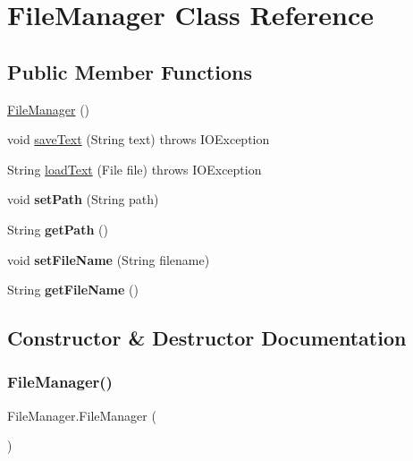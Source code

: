 \hypertarget{class_file_manager}{}\section{File\+Manager Class Reference}
\label{class_file_manager}
\subsection*{Public Member Functions}
\begin{DoxyCompactItemize}
\item 
\mbox{\hyperlink{class_file_manager_aa50d12a023aa967642bdd375208ab1f1}{File\+Manager}} ()
\item 
void \mbox{\hyperlink{class_file_manager_a8e3de78e77b7bf9e4a4581577ff75b23}{save\+Text}} (String text)  throws I\+O\+Exception 
\item 
String \mbox{\hyperlink{class_file_manager_a9515f15130ff9682ad9c5d4e0bea1a68}{load\+Text}} (File file)  throws I\+O\+Exception 
\item 
\mbox{\label{class_file_manager_a302be87d39a4ab64a3f643789a5682a1}} 
void {\bfseries set\+Path} (String path)
\item 
\mbox{\label{class_file_manager_a43a091aa78ffb4a933deb5a2300e3ce7}} 
String {\bfseries get\+Path} ()
\item 
\mbox{\label{class_file_manager_a1ffe939960b809a1337aeb81ec37700b}} 
void {\bfseries set\+File\+Name} (String filename)
\item 
\mbox{\label{class_file_manager_ad1c38c55be4e76f6da7cdc40e89eef5d}} 
String {\bfseries get\+File\+Name} ()
\end{DoxyCompactItemize}


\subsection{Constructor \& Destructor Documentation}
\mbox{\label{class_file_manager_aa50d12a023aa967642bdd375208ab1f1}} 
\subsubsection{\texorpdfstring{File\+Manager()}{FileManager()}}
{\footnotesize\ttfamily File\+Manager.\+File\+Manager (\begin{DoxyParamCaption}{ }\end{DoxyParamCaption})}

